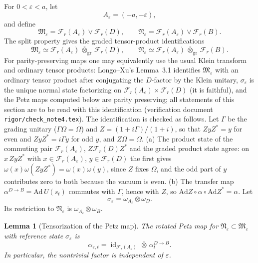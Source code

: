\documentclass[11pt]{article}
\theoremstyle{accent}
\newtheorem{lemma}[theorem]{Lemma}
\theoremstyle{definition}
\newcommand{\cF}{\mathcal{F}}
\newcommand{\cM}{\mathfrak{M}}
\newcommand{\cN}{\mathfrak{N}}
\newcommand{\id}{\operatorname{id}}
\newcommand{\eps}{\varepsilon}
\begin{document}
For \(0<\eps<a\), let
\[
 A_\eps=(-a,-\eps),
\]
and define
\begin{equation}\label{eq:collar-algebras}
 \cM_\eps=\cF_r(A_\eps)\vee\cF_r(D),
 \qquad
 \cN_\eps=\cF_r(A_\eps)\vee\cF_r(B).
\end{equation}
The split property gives the graded tensor-product identifications
\begin{equation}\label{eq:split-identifications}
 \cM_\eps\simeq\cF_r(A_\eps)\,\overline\otimes_{\mathrm{gr}}\,\cF_r(D),
 \qquad
 \cN_\eps\simeq\cF_r(A_\eps)\,\overline\otimes_{\mathrm{gr}}\,\cF_r(B).
\end{equation}
For parity-preserving maps one may equivalently use the usual Klein transform and ordinary tensor products: Longo--Xu's Lemma~3.1 identifies \(\cM_\eps\) with an ordinary tensor product after conjugating the \(D\)-factor by the Klein unitary, \(\sigma_\eps\) is the unique normal state factorizing on \(\cF_r(A_\eps)\times\cF_r(D)\) (it is faithful), and the Petz maps computed below are parity preserving; all statements of this section are to be read with this identification (verification document \texttt{rigor/check\_note4.tex}).  The identification is checked as follows.  Let \(\Gamma\) be the grading unitary (\(\Gamma\Omega=\Omega\)) and \(Z=(1+i\Gamma)/(1+i)\), so that \(ZyZ^*=y\) for even and \(ZyZ^*=i\Gamma y\) for odd \(y\), and \(Z\Omega=\Omega\).  (a) The product state of the commuting pair \(\cF_r(A_\eps)\), \(Z\cF_r(D)Z^*\) and the graded product state agree: on \(x\,ZyZ^*\) with \(x\in\cF_r(A_\eps)\), \(y\in\cF_r(D)\) the first gives \(\omega(x)\omega(ZyZ^*)=\omega(x)\omega(y)\), since \(Z\) fixes \(\Omega\), and the odd part of \(y\) contributes zero to both because the vacuum is even.  (b) The transfer map \(\alpha^{D\to B}=\mathrm{Ad}\,U(s_t)\) commutes with \(\Gamma\), hence with \(Z\), so \(\mathrm{Ad}Z\circ\alpha\circ\mathrm{Ad}Z^*=\alpha\).  Let
\begin{equation}\label{eq:sigma-eps}
 \sigma_\eps=\omega_{A_\eps}\otimes\omega_D.
\end{equation}
Its restriction to \(\cN_\eps\) is \(\omega_{A_\eps}\otimes\omega_B\).

\begin{lemma}[Tensorization of the Petz map]\label{lem:tensorization}
The rotated Petz map for \(\cN_\eps\subset\cM_\eps\) with reference state \(\sigma_\eps\) is
\begin{equation}\label{eq:collar-map}
 \boxed{
 \alpha_{\eps,t}
 =\id_{\cF_r(A_\eps)}\,\overline\otimes\,\alpha_t^{D\to B}.
 }
\end{equation}
In particular, the nontrivial factor is independent of \(\eps\).
\end{lemma}
\end{document}
